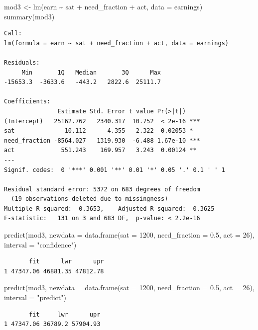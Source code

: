 \documentclass[
]{article}
\newenvironment{Shaded}{\begin{snugshade}}{\end{snugshade}}
\newcommand{\AttributeTok}[1]{\textcolor[rgb]{0.77,0.63,0.00}{#1}}
\newcommand{\DecValTok}[1]{\textcolor[rgb]{0.00,0.00,0.81}{#1}}
\newcommand{\FloatTok}[1]{\textcolor[rgb]{0.00,0.00,0.81}{#1}}
\newcommand{\FunctionTok}[1]{\textcolor[rgb]{0.00,0.00,0.00}{#1}}
\newcommand{\NormalTok}[1]{#1}
\newcommand{\OtherTok}[1]{\textcolor[rgb]{0.56,0.35,0.01}{#1}}
\newcommand{\SpecialCharTok}[1]{\textcolor[rgb]{0.00,0.00,0.00}{#1}}
\newcommand{\StringTok}[1]{\textcolor[rgb]{0.31,0.60,0.02}{#1}}
\begin{document}
\begin{Shaded}
\begin{Highlighting}[]
\NormalTok{mod3 }\OtherTok{\textless{}{-}} \FunctionTok{lm}\NormalTok{(earn }\SpecialCharTok{\textasciitilde{}}\NormalTok{ sat }\SpecialCharTok{+}\NormalTok{ need\_fraction }\SpecialCharTok{+}\NormalTok{ act, }\AttributeTok{data =}\NormalTok{ earnings)}
\FunctionTok{summary}\NormalTok{(mod3)}
\end{Highlighting}
\end{Shaded}

\begin{verbatim}
Call:
lm(formula = earn ~ sat + need_fraction + act, data = earnings)

Residuals:
     Min       1Q   Median       3Q      Max 
-15653.3  -3633.6   -443.2   2822.6  25111.7 

Coefficients:
               Estimate Std. Error t value Pr(>|t|)    
(Intercept)   25162.762   2340.317  10.752  < 2e-16 ***
sat              10.112      4.355   2.322  0.02053 *  
need_fraction -8564.027   1319.930  -6.488 1.67e-10 ***
act             551.243    169.957   3.243  0.00124 ** 
---
Signif. codes:  0 '***' 0.001 '**' 0.01 '*' 0.05 '.' 0.1 ' ' 1

Residual standard error: 5372 on 683 degrees of freedom
  (19 observations deleted due to missingness)
Multiple R-squared:  0.3653,    Adjusted R-squared:  0.3625 
F-statistic:   131 on 3 and 683 DF,  p-value: < 2.2e-16
\end{verbatim}

\begin{Shaded}
\begin{Highlighting}[]
\FunctionTok{predict}\NormalTok{(mod3, }\AttributeTok{newdata =} \FunctionTok{data.frame}\NormalTok{(}\AttributeTok{sat =} \DecValTok{1200}\NormalTok{, }\AttributeTok{need\_fraction =} \FloatTok{0.5}\NormalTok{, }\AttributeTok{act =} \DecValTok{26}\NormalTok{), }\AttributeTok{interval =} \StringTok{"confidence"}\NormalTok{)}
\end{Highlighting}
\end{Shaded}

\begin{verbatim}
       fit      lwr      upr
1 47347.06 46881.35 47812.78
\end{verbatim}

\begin{Shaded}
\begin{Highlighting}[]
\FunctionTok{predict}\NormalTok{(mod3, }\AttributeTok{newdata =} \FunctionTok{data.frame}\NormalTok{(}\AttributeTok{sat =} \DecValTok{1200}\NormalTok{, }\AttributeTok{need\_fraction =} \FloatTok{0.5}\NormalTok{, }\AttributeTok{act =} \DecValTok{26}\NormalTok{), }\AttributeTok{interval =} \StringTok{"predict"}\NormalTok{)}
\end{Highlighting}
\end{Shaded}

\begin{verbatim}
       fit     lwr      upr
1 47347.06 36789.2 57904.93
\end{verbatim}
\end{document}
